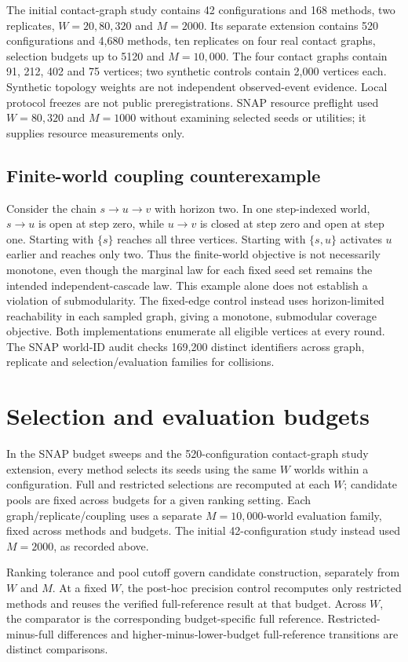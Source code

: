 \documentclass[smallextended]{svjour3}
\begin{document}
The initial contact-graph study contains 42 configurations and 168 methods, two replicates,
$W=20,80,320$ and $M=2000$. Its separate extension contains 520 configurations and
4,680 methods, ten replicates on four real contact graphs, selection budgets up to 5120
and $M=10,000$. The four contact graphs contain 91, 212, 402 and 75 vertices;
two synthetic controls contain 2,000 vertices each. Synthetic topology weights
are not independent observed-event evidence. Local protocol freezes are not
public preregistrations. SNAP resource preflight used $W=80,320$ and
$M=1000$ without examining selected seeds or utilities; it supplies resource
measurements only.

\subsection{Finite-world coupling counterexample}
Consider the chain $s\to u\to v$ with horizon two. In one step-indexed world,
$s\to u$ is open at step zero, while $u\to v$ is closed at step zero and open
at step one. Starting with $\{s\}$ reaches all three vertices. Starting with
$\{s,u\}$ activates $u$ earlier and reaches only two. Thus the finite-world
objective is not necessarily monotone, even though the marginal law for each
fixed seed set remains the intended independent-cascade law. This example alone
does not establish a violation of submodularity. The fixed-edge control instead
uses horizon-limited reachability in each sampled graph, giving a monotone,
submodular coverage objective. Both implementations enumerate all eligible
vertices at every round. The SNAP world-ID audit checks 169,200 distinct
identifiers across graph, replicate and selection/evaluation families for collisions.

\section{Selection and evaluation budgets}
In the SNAP budget sweeps and the 520-configuration contact-graph study extension, every method selects its seeds using the same $W$ worlds within a configuration. Full and restricted selections are recomputed at each $W$; candidate pools are fixed across budgets for a given ranking setting. Each graph/replicate/coupling uses a separate $M=10,000$-world evaluation family, fixed across methods and budgets. The initial 42-configuration study instead used $M=2000$, as recorded above.

Ranking tolerance and pool cutoff govern candidate construction, separately from $W$ and $M$. At a fixed $W$, the post-hoc precision control recomputes only restricted methods and reuses the verified full-reference result at that budget. Across $W$, the comparator is the corresponding budget-specific full reference. Restricted-minus-full differences and higher-minus-lower-budget full-reference transitions are distinct comparisons.
\end{document}
